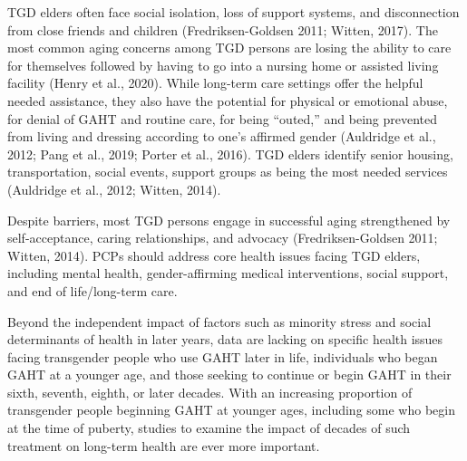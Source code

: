\documentclass[
]{book}
\begin{document}
TGD elders often face social isolation, loss of
support systems, and disconnection from close
friends and children (Fredriksen-Goldsen 2011;
Witten, 2017). The most common aging concerns
among TGD persons are losing the ability to care
for themselves followed by having to go into a
nursing home or assisted living facility (Henry
et al., 2020). While long-term care settings offer
the helpful needed assistance, they also have the
potential for physical or emotional abuse, for denial
of GAHT and routine care, for being ``outed,'' and
being prevented from living and dressing according
to one's affirmed gender (Auldridge et al., 2012;
Pang et al., 2019; Porter et al., 2016). TGD elders
identify senior housing, transportation, social
events, support groups as being the most needed
services (Auldridge et al., 2012; Witten, 2014).

Despite barriers, most TGD persons engage in
successful aging strengthened by self-acceptance, caring relationships, and advocacy (Fredriksen-Goldsen
2011; Witten, 2014). PCPs should address core health
issues facing TGD elders, including mental health,
gender-affirming medical interventions, social support, and end of life/long-term care.

Beyond the independent impact of factors such
as minority stress and social determinants of
health in later years, data are lacking on specific
health issues facing transgender people who use
GAHT later in life, individuals who began GAHT
at a younger age, and those seeking to continue
or begin GAHT in their sixth, seventh, eighth,
or later decades. With an increasing proportion
of transgender people beginning GAHT at
younger ages, including some who begin at the
time of puberty, studies to examine the impact
of decades of such treatment on long-term health
are ever more important.
\end{document}
